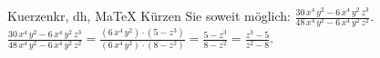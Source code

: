 \begin{MAufgabe}{Kuerzen}{kr, dh, MaTeX}
K\"urzen Sie soweit m\"oglich: $\frac{30\, x^4\, y^2 - 6\, x^4\, y^2\, z^3}{48\, x^4\, y^2 - 6\, x^4\, y^2\, z^2}$.\\ 
\ifLsg\MLoesung
\quad $\frac{30\, x^4\, y^2 - 6\, x^4\, y^2\, z^3}{48\, x^4\, y^2 - 6\, x^4\, y^2\, z^2}=\frac{(6\, x^4\, y^2)\cdot(5 - z^3)}{(6\, x^4\, y^2)\cdot(8 - z^2)}=\frac{5 - z^3}{8 - z^2}=\frac{z^3 - 5}{z^2 - 8}$.\else\relax\fi
 \end{MAufgabe}
